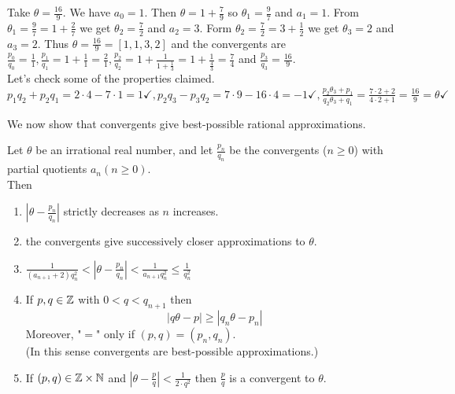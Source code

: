 \documentclass[NumTh.tex]{subfiles}
\begin{document}
\begin{ex*}
  Take $\theta = \frac{16}{9}$. We have $a_0 = 1$. Then $\theta = 1 + \frac{7}{9}$ so $\theta_1 = \frac{9}{7}$ and $a_1 = 1$. 
  From $\theta_1 = \frac{9}{7} = 1 + \frac{2}{7}$ we get $\theta_2 = \frac{7}{2}$ and $a_2 = 3$.
  Form $\theta_2 = \frac{7}{2} = 3 + \frac{1}{2}$ we get $\theta_3 = 2$ and $a_3 = 2$.
  Thus $\theta = \frac{16}{9} = [1,1,3,2]$ and the convergents are $\frac{p_0}{q_0} = \frac{1}{1}, \frac{p_1}{q_1} = 1 + \frac{1}{1} = \frac{2}{1}, \frac{p_2}{q_2} = 1 + \frac{1}{1+\frac{1}{3}} = 1 + \frac{1}{\frac{4}{3}} = \frac{7}{4}$ 
  and $\frac{p_3}{q_3} = \frac{16}{9}$. \\
  Let's check some of the properties claimed.\\
  $p_1 q_2 + p_2 q_1 = 2\cdot 4 - 7 \cdot 1 = 1 \checkmark, p_2 q_3 - p_3 q_2 = 7\cdot 9 - 16 \cdot 4 = -1 \checkmark,
  \frac{p_2 \theta_3 + p_1}{q_2 \theta_3 +q_1} = \frac{ 7 \cdot 2 + 2}{4 \cdot 2 +1} = \frac{16}{9} = \theta \checkmark$
\end{ex*}

We now show that convergents give best-possible rational approximations.

\begin{theorem}\label{1_2_3}
  Let $\theta$ be an irrational real number, and let $\frac{p_n}{q_n}$ be the convergents ($n \geq 0$) with partial quotients $a_n (n \geq 0)$.\\
  Then
  \begin{enumerate} %
    \item $ | \theta - \frac{p_n}{q_n}|$ strictly decreases as $n$ increases.
    \item the convergents give successively closer approximations to $\theta$.
    \item $\frac{1}{(a_{n+1} + 2) q_n^2} < |\theta - \frac{p_n}{q_n}| < \frac{1}{a_{n+1} q_n^2} \leq \frac{1}{q_n^2}$
    \item If $p,q \in \mathbb{Z}$ with $0 < q < q_{n+1}$ then
    \[ |q \theta - p| \geq |q_n \theta - p_n| \]
    Moreover, "$=$" only if $(p,q) = (p_n,q_n)$.\\
    (In this sense convergents are best-possible approximations.)
    \item If $(p,q) \in \mathbb{Z} \times \mathbb{N}$ and $|\theta - \frac{p}{q}| < \frac{1}{2\cdot q^2}$ then $\frac{p}{q}$ is a convergent to $\theta$.
  \end{enumerate}
\end{theorem}
\end{document}
